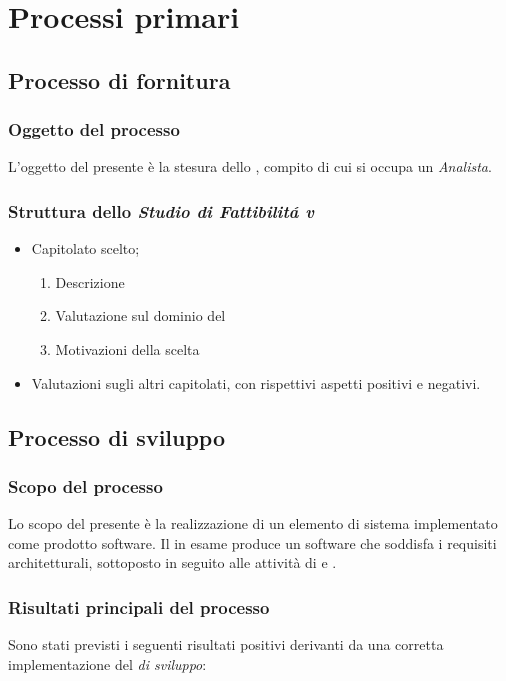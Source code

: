\section{Processi primari}

	\subsection{Processo di fornitura}	
	\subsubsection{Oggetto del processo}
	L'oggetto del presente  è la stesura dello \StudioDiFattibilita, compito
	di cui si occupa un \textit{Analista}.
	\subsubsection{Struttura dello \textit{Studio di Fattibilit\'a v\VersioneSF{}}}
		\begin{itemize}
			\item Capitolato scelto;
				\begin{enumerate}
					\item Descrizione
					\item Valutazione sul dominio del 
					\item Motivazioni della scelta
				\end{enumerate}	
			\item Valutazioni sugli altri capitolati, con rispettivi aspetti positivi e negativi.
		\end{itemize}


	\subsection{Processo di sviluppo}
        \subsubsection{Scopo del processo}
        Lo scopo del presente  \`e la realizzazione di un elemento di sistema implementato come prodotto
        software. Il  in esame produce un software che soddisfa i requisiti architetturali, sottoposto
        in seguito alle attivit\`a di  e .
        
        \subsubsection{Risultati principali del processo}
        Sono stati previsti i seguenti risultati positivi derivanti da una corretta implementazione del \textit{ di sviluppo}:

